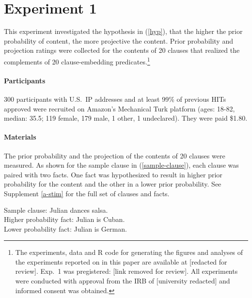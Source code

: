 \documentclass[11pt,fleqn]{article}
\newcommand{\6}{\mbox{$[\hspace*{-.6mm}[$}}
\newcommand{\9}{\mbox{$]\hspace*{-.6mm}]$}}
\begin{document}

\section{Experiment 1}\label{s2}

This experiment investigated the hypothesis in (\ref{hyp}), that the higher the prior probability of content, the more projective the content. Prior probability and projection ratings were collected for the contents of 20 clauses that realized the complements of 20 clause-embedding predicates.\footnote{\label{f-github}The experiments, data and R code for generating the figures and analyses of the experiments reported on in this paper are available at [redacted for review]. Exp.~1 was pregistered: [link removed for review]. All experiments were conducted with approval from the IRB of [university redacted] and informed consent was obtained.}

\paragraph{Participants} 300 participants with U.S.\ IP addresses and at least 99\% of previous HITs approved were recruited on Amazon's Mechanical Turk platform (ages: 18-82, median: 35.5; 119 female, 179 male, 1 other, 1 undeclared). They were paid \$1.80.

\paragraph{Materials} The prior probability and the projection of the contents of 20 clauses were measured. As shown for the sample clause in (\ref{sample-clause}), each clause was paired with two facts. One fact was hypothesized to result in higher prior probability for the content  and the other in a lower prior probability. See Supplement \ref{a-stim} for the full set of clauses and facts. 

\begin{exe}
\ex\label{sample-clause} Sample clause: Julian dances salsa.
\\ Higher probability fact: Julian is Cuban.
\\ Lower probability fact: Julian is German.
\end{exe}
\end{document}
